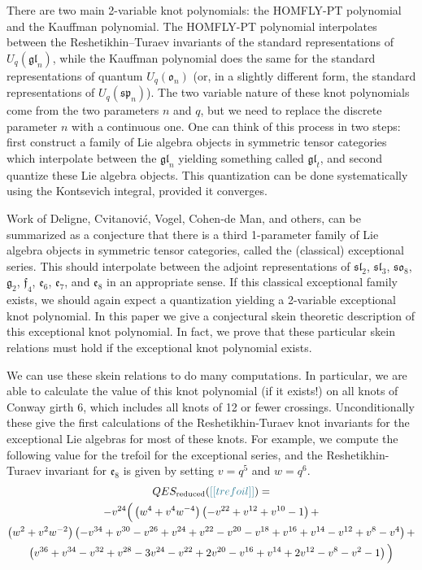 \documentclass[12pt]{amsart}
\begin{document}
There are two main 2-variable knot polynomials: the HOMFLY-PT polynomial and
the Kauffman polynomial.  The HOMFLY-PT polynomial interpolates between the
Reshetikhin--Turaev invariants of the standard representations of
$U_q(\mathfrak{gl}_n)$, while the Kauffman polynomial does the same for the
standard representations of quantum $U_q(\mathfrak{o}_n)$ (or, in a slightly
different form, the standard representations of $U_q(\mathfrak{sp}_n)$).  The
two variable nature of these knot polynomials come from the two parameters $n$
and $q$, but we need to replace the discrete parameter $n$ with a continuous
one.   One can think of this process in two steps: first construct a family of
Lie algebra objects in symmetric tensor categories which interpolate between
the $\mathfrak{gl}_n$ yielding something called $\mathfrak{gl}_t$, and second
quantize these Lie algebra objects.   This quantization can be done
systematically using the Kontsevich integral, provided it converges.

Work of Deligne, Cvitanović, Vogel, Cohen-de Man, and others, can be
summarized as a conjecture that there is a third 1-parameter family of Lie
algebra objects in symmetric tensor categories, called the (classical)
exceptional series. This should interpolate between the adjoint
representations of $\mathfrak{sl}_2$, $\mathfrak{sl}_3$, $\mathfrak{so}_8$,
$\mathfrak{g}_2$, $\mathfrak{f}_4$, $\mathfrak{e}_6$, $\mathfrak{e}_7$, and
$\mathfrak{e}_8$ in an appropriate sense.  If this classical exceptional
family exists, we should again expect a quantization yielding a 2-variable
exceptional knot polynomial.  In this paper we give a conjectural skein
theoretic description of this exceptional knot polynomial. In fact, we prove
that these particular skein relations must hold if the exceptional knot
polynomial exists.

We can use these skein relations to do many computations.  In particular, we
are able to calculate the value of this knot polynomial (if it exists!) on all
knots of Conway girth 6, which includes all knots of 12 or fewer crossings.
Unconditionally these give the first calculations of the Reshetikhin-Turaev
knot invariants for the exceptional Lie algebras for most of these knots.  For
example, we compute the following value for the trefoil for the exceptional
series, and the Reshetikhin-Turaev invariant for $\mathfrak{e}_8$ is given by
setting $v=q^5$ and $w=q^6$.
\begin{multline*}
QES_{\text{reduced}}(\nn{trefoil}) = \\
-v^{24}
\Big(
    \left(w^4 + v^4 w^{-4}\right)\left(-v^{22}+v^{12}+v^{10}-1\right)+\\
    \left(w^2 + v^2 w^{-2}\right)\left(-v^{34}+v^{30}-v^{26}+v^{24}+v^{22}-v^{20}-v^{18}+v^{16}+v^{14}-v^{12}+v^8-v^4\right)+\\
    \left(v^{36}+v^{34}-v^{32}+v^{28}-3 v^{24}-v^{22}+2 v^{20}-v^{16}+v^{14}+2 v^{12}-v^8-v^2-1\right)
    \Big)
\end{multline*}
\end{document}
